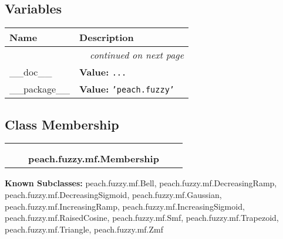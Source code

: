 
  \subsection{Variables}

    \vspace{-1cm}
\hspace{\varindent}\begin{longtable}{|p{\varnamewidth}|p{\vardescrwidth}|l}
\cline{1-2}
\cline{1-2} \centering \textbf{Name} & \centering \textbf{Description}& \\
\cline{1-2}
\endhead\cline{1-2}\multicolumn{3}{r}{\small\textit{continued on next page}}\\\endfoot\cline{1-2}
\endlastfoot\raggedright \_\-\_\-d\-o\-c\-\_\-\_\- & \raggedright \textbf{Value:} 
{\tt \texttt{...}}&\\
\cline{1-2}
\raggedright \_\-\_\-p\-a\-c\-k\-a\-g\-e\-\_\-\_\- & \raggedright \textbf{Value:} 
{\tt \texttt{'}\texttt{peach.fuzzy}\texttt{'}}&\\
\cline{1-2}
\end{longtable}



\subsection{Class Membership}

    \label{peach:fuzzy:mf:Membership}
\begin{tabular}{cccccc}
\multicolumn{2}{r}{\settowidth{\BCL}{object}\multirow{2}{\BCL}{object}}
&&
  \\\cline{3-3}
  &&\multicolumn{1}{c|}{}
&&
  \\
&&\multicolumn{2}{l}{\textbf{peach.fuzzy.mf.Membership}}
\end{tabular}

\textbf{Known Subclasses:}
peach.fuzzy.mf.Bell,
    peach.fuzzy.mf.DecreasingRamp,
    peach.fuzzy.mf.DecreasingSigmoid,
    peach.fuzzy.mf.Gaussian,
    peach.fuzzy.mf.IncreasingRamp,
    peach.fuzzy.mf.IncreasingSigmoid,
    peach.fuzzy.mf.RaisedCosine,
    peach.fuzzy.mf.Smf,
    peach.fuzzy.mf.Trapezoid,
    peach.fuzzy.mf.Triangle,
    peach.fuzzy.mf.Zmf


